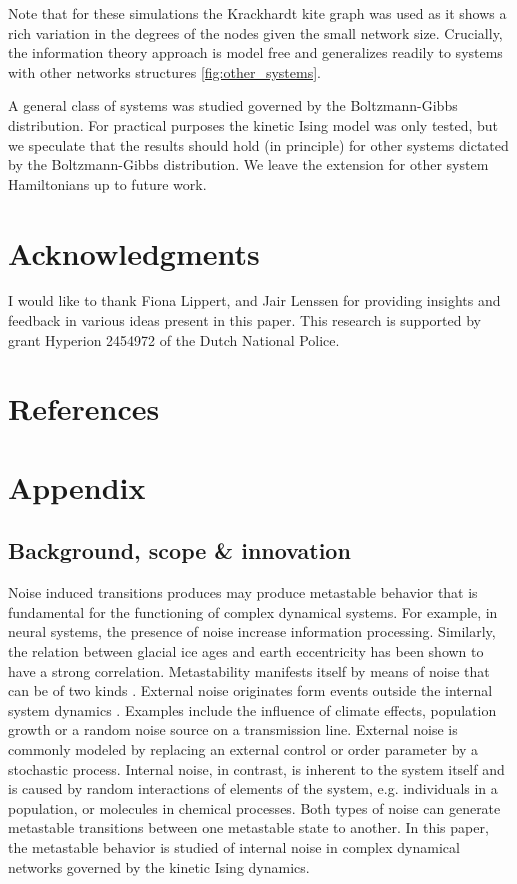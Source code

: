\documentclass[a4paper, 11pt, twocolumn]{article}
\begin{document}
Note that  for these  simulations the Krackhardt  kite graph
was used as it shows a  rich variation in the degrees of the
nodes  given   the  small   network  size.   Crucially,  the
information theory  approach is  model free  and generalizes
readily   to   systems   with  other   networks   structures
\cref{fig:other_systems}.

A  general class  of  systems was  studied  governed by  the
Boltzmann-Gibbs  distribution.  For practical  purposes  the
kinetic Ising model  was only tested, but  we speculate that
the  results should  hold (in  principle) for  other systems
dictated by  the Boltzmann-Gibbs distribution. We  leave the
extension for other system Hamiltonians up to future work.

\section{Acknowledgments}
\label{sec:orgf30530a}
I would like to thank Fiona Lippert, and Jair Lenssen for providing
insights and feedback in various ideas present in this paper. This
research is supported by grant Hyperion 2454972 of the Dutch National
Police.

\section{References}
\label{sec:org26fe258}
\section{Appendix}
\label{sec:org854db8e}
\subsection{Background, scope \& innovation}
\label{sec:orgd888f8c}
Noise  induced transitions  produces may  produce metastable
behavior that is fundamental  for the functioning of complex
dynamical  systems.  For  example, in  neural  systems,  the
presence   of   noise   increase   information   processing.
Similarly, the  relation between glacial ice  ages and earth
eccentricity has  been shown  to have a  strong correlation.
Metastability manifests itself by means of noise that can be
of two  kinds \cite{Forgoston2018}. External  noise originates
form   events   outside   the   internal   system   dynamics
\cite{Calim2021,Czaplicka2013a}.    Examples    include    the
influence of climate effects,  population growth or a random
noise  source  on a  transmission  line.  External noise  is
commonly modeled  by replacing an external  control or order
parameter  by  a  stochastic  process.  Internal  noise,  in
contrast, is inherent to the  system itself and is caused by
random  interactions   of  elements  of  the   system,  e.g.
individuals  in  a  population,  or  molecules  in  chemical
processes.  Both  types  of noise  can  generate  metastable
transitions between one metastable state to another. In this
paper, the metastable behavior  is studied of internal noise
in complex dynamical networks  governed by the kinetic Ising
dynamics.
\end{document}
